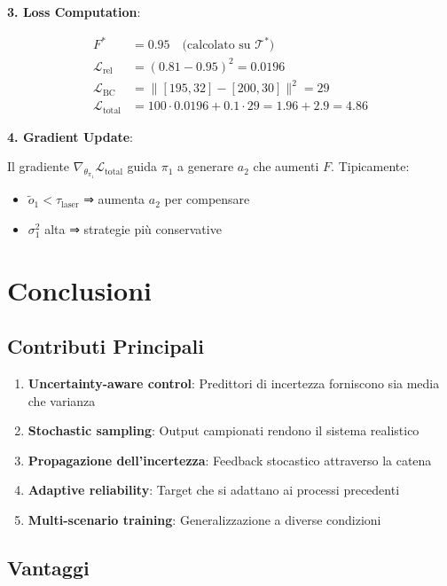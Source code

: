 \documentclass[11pt,a4paper]{article}
\begin{document}
\textbf{3. Loss Computation}:

\begin{align}
F^* &= 0.95 \quad \text{(calcolato su } \mathcal{T}^*) \\
\mathcal{L}_{\text{rel}} &= (0.81 - 0.95)^2 = 0.0196 \\
\mathcal{L}_{\text{BC}} &= \|[195,32] - [200,30]\|^2 = 29 \\
\mathcal{L}_{\text{total}} &= 100 \cdot 0.0196 + 0.1 \cdot 29 = 1.96 + 2.9 = 4.86
\end{align}

\textbf{4. Gradient Update}:

Il gradiente $\nabla_{\theta_{\pi_1}} \mathcal{L}_{\text{total}}$ guida $\pi_1$ a generare $a_2$ che aumenti $F$. Tipicamente:
\begin{itemize}
    \item $\tilde{o}_1 < \tau_{\text{laser}}$ ⇒ aumenta $a_2$ per compensare
    \item $\sigma_1^2$ alta ⇒ strategie più conservative
\end{itemize}

\section{Conclusioni}

\subsection{Contributi Principali}

\begin{enumerate}
    \item \textbf{Uncertainty-aware control}: Predittori di incertezza forniscono sia media che varianza
    \item \textbf{Stochastic sampling}: Output campionati rendono il sistema realistico
    \item \textbf{Propagazione dell'incertezza}: Feedback stocastico attraverso la catena
    \item \textbf{Adaptive reliability}: Target che si adattano ai processi precedenti
    \item \textbf{Multi-scenario training}: Generalizzazione a diverse condizioni
\end{enumerate}

\subsection{Vantaggi}
\end{document}
